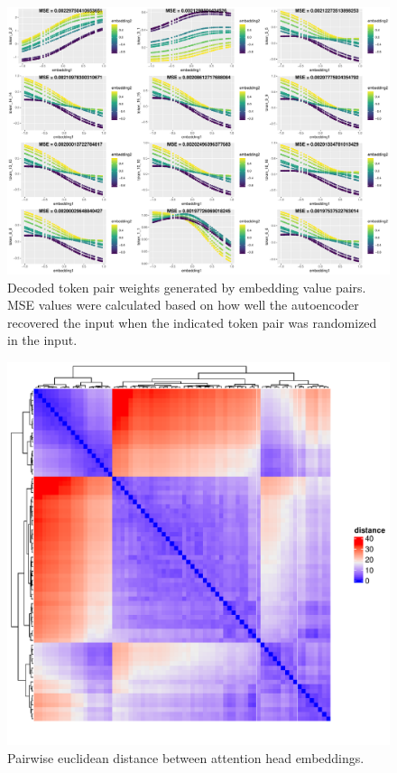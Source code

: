 \documentclass{article}
\begin{document}
\begin{figure}
	\includegraphics[width=\textwidth]{figs/top.embeddings.pdf}
	\caption{Decoded token pair weights generated by embedding value pairs. MSE values were calculated based on how well the autoencoder recovered the input when the indicated token pair was randomized in the input.}
	\label{}
\end{figure}

\begin{figure}
	\includegraphics[width=\textwidth]{figs/dist.pdf}
	\caption{Pairwise euclidean distance between attention head embeddings.}
	\label{}
\end{figure}
\end{document}
